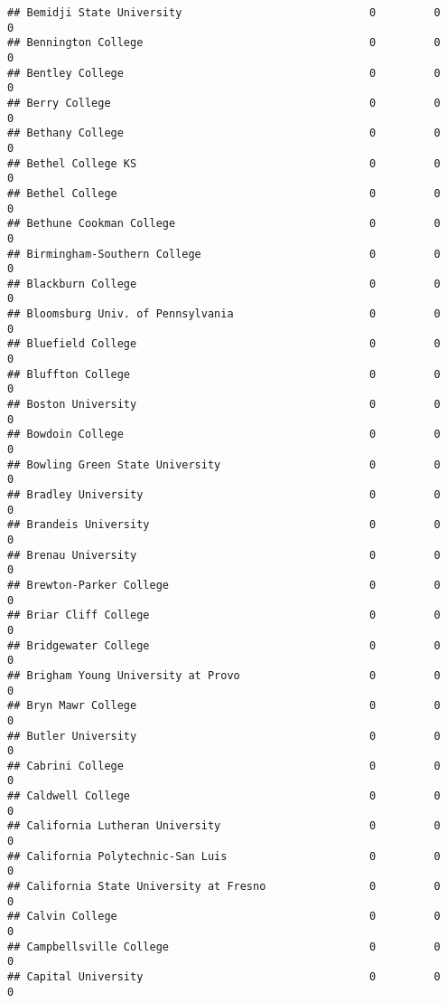 \documentclass[
]{article}
\begin{document}
\begin{verbatim}
## Bemidji State University                             0         0           0
## Bennington College                                   0         0           0
## Bentley College                                      0         0           0
## Berry College                                        0         0           0
## Bethany College                                      0         0           0
## Bethel College KS                                    0         0           0
## Bethel College                                       0         0           0
## Bethune Cookman College                              0         0           0
## Birmingham-Southern College                          0         0           0
## Blackburn College                                    0         0           0
## Bloomsburg Univ. of Pennsylvania                     0         0           0
## Bluefield College                                    0         0           0
## Bluffton College                                     0         0           0
## Boston University                                    0         0           0
## Bowdoin College                                      0         0           0
## Bowling Green State University                       0         0           0
## Bradley University                                   0         0           0
## Brandeis University                                  0         0           0
## Brenau University                                    0         0           0
## Brewton-Parker College                               0         0           0
## Briar Cliff College                                  0         0           0
## Bridgewater College                                  0         0           0
## Brigham Young University at Provo                    0         0           0
## Bryn Mawr College                                    0         0           0
## Butler University                                    0         0           0
## Cabrini College                                      0         0           0
## Caldwell College                                     0         0           0
## California Lutheran University                       0         0           0
## California Polytechnic-San Luis                      0         0           0
## California State University at Fresno                0         0           0
## Calvin College                                       0         0           0
## Campbellsville College                               0         0           0
## Capital University                                   0         0           0

\end{verbatim}
\end{document}
